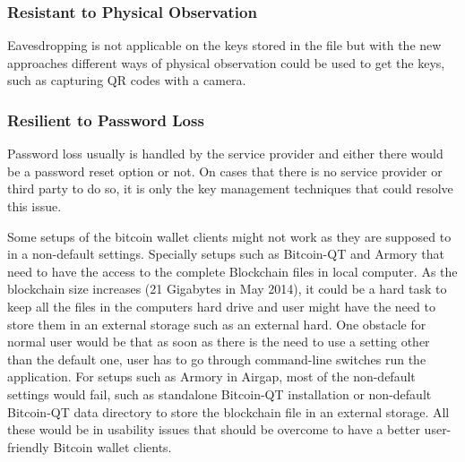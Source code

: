\subsubsection{Resistant to Physical Observation}
\label{Resistant to Physical Observation}
Eavesdropping is not applicable on the keys stored in the file but with the new approaches different ways of physical observation could be used to get the keys, such as capturing QR codes with a camera.

\subsubsection{Resilient to Password Loss}
\label{Resilient to Password Loss}
Password loss usually is handled by the service provider and either there would be a password reset option or not. On cases that there is no service provider or third party to do so, it is only the key management techniques that could resolve this issue.



Some setups of the bitcoin wallet clients might not work as they are supposed to in a non-default settings. Specially setups such as Bitcoin-QT and Armory that need to have the access to the complete Blockchain files in local computer. As the blockchain size increases (21 Gigabytes in May 2014), it could be a hard task to keep all the files in the computers hard drive and user might have the need to store them in an external storage such as an external hard. One obstacle for normal user would be that as soon as there is the need to use a setting other than the default one, user has to go through command-line switches run the application. For setups such as Armory in Airgap, most of the non-default settings would fail, such as standalone Bitcoin-QT installation or non-default Bitcoin-QT data directory to store the blockchain file in an external storage. All these would be in usability issues that should be overcome to have a better user-friendly Bitcoin wallet clients. 


